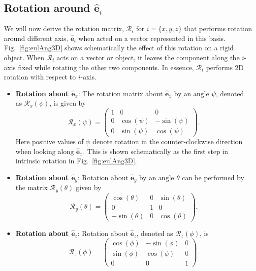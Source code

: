\documentclass{article}
\def\eh{\hat{\mathbf{e}}}
\def\R{\mathcal{R}}
\begin{document}
\subsection{Rotation around \texorpdfstring{$\eh_i$}{eh}}
We will now derive the rotation matrix, $\R_i$ for $i = \{ x, y, z \}$ that performs rotation around different axis, $\eh_i$ when acted on a vector represented in this basis. Fig.~\ref{fig:eulAng3D} shows schematically the effect of this rotation on a rigid object. When $\R_i$ acts on a vector or object, it leaves the component along the $i$-axis fixed while rotating the other two components. In essence, $\R_i$ performs 2D rotation with respect to $i$-axis.
\begin{itemize}
    \item \textbf{Rotation about $\eh_x$}: 
    The rotation matrix about $\eh_x$ by an angle $\psi$, denoted as $\R_x (\psi)$, is given by
    \[
      \R_x(\psi) = 
      \begin{pmatrix} 
    1 & 0 & 0 \\
    0 & \cos(\psi) & -\sin(\psi) \\
    0 & \sin(\psi) & \cos(\psi) 
    \end{pmatrix}.
    \]
    Here positive values of $\psi$ denote rotation in the counter-clockwise direction when looking along $\eh_x$. This is shown schematically as the first step in intrinsic rotation in Fig.~\ref{fig:eulAng3D}.

    \item \textbf{Rotation about $\eh_y$}:
    Rotation about $\eh_y$ by an angle $\theta$ can be performed by the matrix $\R_y(\theta)$ given by
    \[
      \R_y(\theta) =
      \begin{pmatrix} 
    \cos(\theta) & 0 & \sin(\theta) \\
    0 & 1 & 0 \\
    -\sin(\theta) & 0 & \cos(\theta) 
    \end{pmatrix}.
    \]

    \item \textbf{Rotation about $\eh_z$}:
    Rotation about $\eh_z$, denoted as $\R_z(\phi)$, is
    \[
      \R_z(\phi) = 
      \begin{pmatrix} 
    \cos(\phi) & -\sin(\phi) & 0 \\
    \sin(\phi) & \cos(\phi) & 0 \\
    0 & 0 & 1 
    \end{pmatrix}.
    \]
\end{itemize}
\end{document}
